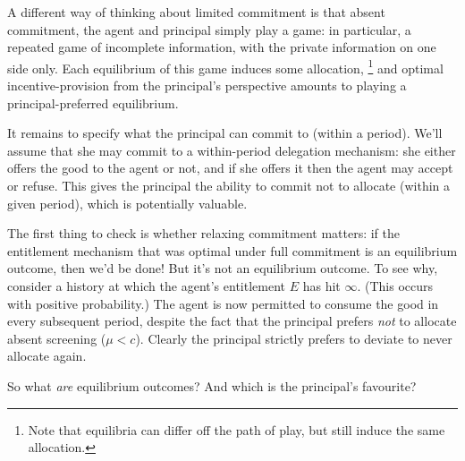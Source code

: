 A different way of thinking about limited commitment is that absent commitment, the agent and principal simply play a game: in particular, a repeated game of incomplete information, with the private information on one side only.
Each equilibrium of this game induces some allocation,%
	\footnote{Note that equilibria can differ off the path of play, but still induce the same allocation.}
and optimal incentive-provision from the principal's perspective
amounts to playing a principal-preferred equilibrium.

It remains to specify what the principal can commit to (within a period).
We'll assume that she may commit to a within-period delegation mechanism:
she either offers the good to the agent or not,
and if she offers it then the agent may accept or refuse.
This gives the principal the ability to commit not to allocate (within a given period), which is potentially valuable.


The first thing to check is whether relaxing commitment matters:
if the entitlement mechanism that was optimal under full commitment is an equilibrium outcome, then we'd be done!
But it's not an equilibrium outcome.
To see why, consider a history at which the agent's entitlement $E$ has hit $\infty$. (This occurs with positive probability.)
The agent is now permitted to consume the good in every subsequent period, despite the fact that the principal prefers \emph{not} to allocate absent screening ($\mu < c$).
Clearly the principal strictly prefers to deviate to never allocate again.

So what \emph{are} equilibrium outcomes?
And which is the principal's favourite?


